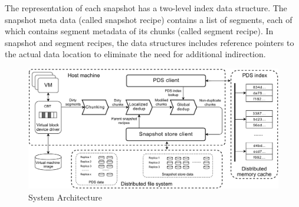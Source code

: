 The representation of each snapshot has  a two-level index data structure.
The snapshot meta data (called snapshot recipe) contains a list of segments, each of which contains segment
metadata of its chunks (called segment recipe).
In snapshot and segment recipes, 
the data structures  includes reference pointers to the actual data location to eliminate the need for additional indirection.







\begin{figure}[t]
    \centering
    \includegraphics[width=6in]{images/socc_arch_cluster}
    \caption{System Architecture}
    \label{fig:arch_vm}
\end{figure}

